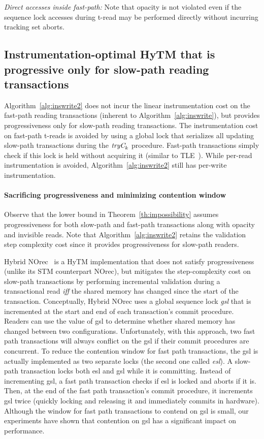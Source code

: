 \vspace{1mm}\noindent\textit{Direct accesses inside fast-path:}
Note that opacity is not violated even if the sequence lock accesses during t-read may be performed directly without incurring tracking set aborts.

\subsection{Instrumentation-optimal HyTM that is progressive only for slow-path reading transactions}
Algorithm~\ref{alg:inswrite2} does not incur the linear instrumentation cost
on the fast-path reading transactions (inherent to Algorithm~\ref{alg:inswrite}), but provides progressiveness only
for slow-path reading transactions. 
The instrumentation cost on fast-path t-reads is avoided by using a global lock that serializes all updating slow-path transactions
during the $\textit{tryC}_k$ procedure. Fast-path transactions simply check if this lock is held without acquiring it (similar to TLE~\cite{tle}). While per-read instrumentation is avoided, Algorithm~\ref{alg:inswrite2} still has per-write instrumentation.

\paragraph{Sacrificing progressiveness and minimizing contention window}
Observe that the lower bound in Theorem~\ref{th:impossibility} assumes progressiveness for both slow-path and fast-path transactions
along with opacity and invisible reads. Note that Algorithm~\ref{alg:inswrite2} retains the validation step complexity cost since it provides progressiveness for slow-path readers.

Hybrid NOrec~\cite{hybridnorec} is a HyTM implementation that does not satisfy progressiveness
(unlike its STM counterpart NOrec), but mitigates
the step-complexity cost on slow-path transactions by performing incremental validation 
during a transactional read \emph{iff} 
the shared memory has changed since the start of the transaction.
Conceptually, Hybrid NOrec uses a global sequence lock \emph{gsl} that is incremented 
at the start and end of each transaction's commit procedure.
Readers can use the value of gsl to determine whether shared memory has changed between two configurations.
Unfortunately, with this approach, two fast path transactions will always conflict on the gsl if their 
commit procedures are concurrent.
To reduce the contention window for fast path transactions, the gsl is actually implemented as two separate locks (the second one called \emph{esl}).
A slow-path transaction locks both esl and gsl while it is committing.
Instead of incrementing gsl, a fast path transaction checks if esl is locked and aborts if it is.
Then, at the end of the fast path transaction's commit procedure, 
it increments gsl twice (quickly locking and releasing it and immediately commits in hardware).
Although the window for fast path transactions to contend on gsl is small, our experiments have shown that contention on gsl has a significant impact on performance.

